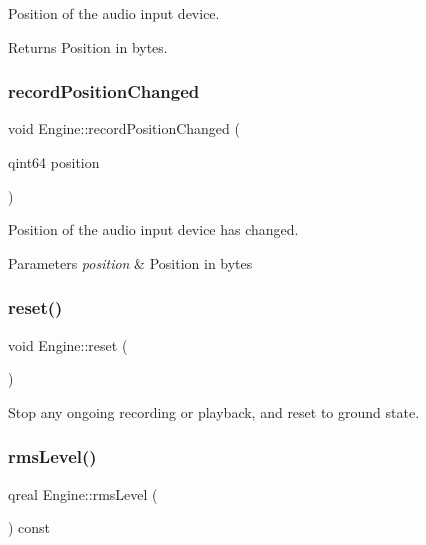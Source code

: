 Position of the audio input device. \begin{DoxyReturn}{Returns}
Position in bytes. 
\end{DoxyReturn}
\hypertarget{class_engine_ad44be9915af75cf3dab1c3a5a4665693}{}\label{class_engine_ad44be9915af75cf3dab1c3a5a4665693} 
\subsubsection{\texorpdfstring{record\+Position\+Changed}{recordPositionChanged}}
{\footnotesize\ttfamily void Engine\+::record\+Position\+Changed (\begin{DoxyParamCaption}\item[{qint64}]{position }\end{DoxyParamCaption})\hspace{0.3cm}{\ttfamily [signal]}}

Position of the audio input device has changed. 
\begin{DoxyParams}{Parameters}
{\em position} & Position in bytes \\
\hline
\end{DoxyParams}
\hypertarget{class_engine_ac3b86066213c3e8a1b5186426c12bb50}{}\label{class_engine_ac3b86066213c3e8a1b5186426c12bb50} 
\subsubsection{\texorpdfstring{reset()}{reset()}}
{\footnotesize\ttfamily void Engine\+::reset (\begin{DoxyParamCaption}{ }\end{DoxyParamCaption})}

Stop any ongoing recording or playback, and reset to ground state. \hypertarget{class_engine_a0a7764981d74fab25e390fa6f91aeb03}{}\label{class_engine_a0a7764981d74fab25e390fa6f91aeb03} 
\subsubsection{\texorpdfstring{rms\+Level()}{rmsLevel()}}
{\footnotesize\ttfamily qreal Engine\+::rms\+Level (\begin{DoxyParamCaption}{ }\end{DoxyParamCaption}) const\hspace{0.3cm}{\ttfamily [inline]}}


